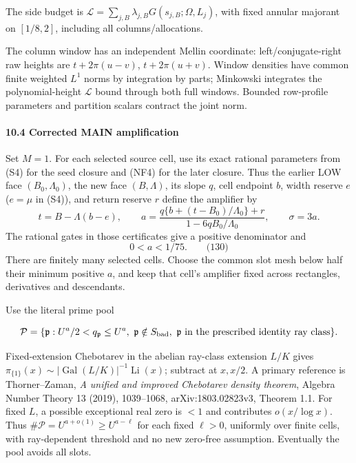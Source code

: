 The side budget is \(\mathcal L=\sum_{j,B}\lambda_{j,B}G(s_{j,B};\Omega,L_j)\), with fixed annular majorant on \([1/8,2]\), including all columns/allocations.

The column window has an independent Mellin coordinate: left/conjugate-right raw heights are \(t+2\pi(u-v)\), \(t+2\pi(u+v)\). Window densities have common finite weighted \(L^1\) norms by integration by parts; Minkowski integrates the polynomial-height \(\mathcal L\) bound through both full windows. Bounded row-profile parameters and partition scalars contract the joint norm.

\hypertarget{sr:amplifier}{}

\label{sr:amplifier}

\hypertarget{amplification-with-its-exact-local-errors}{%
\paragraph{10.4 Corrected MAIN amplification}\label{amplification-with-its-exact-local-errors}}

Set \(M=1\). For each selected source cell, use its exact rational
parameters from (S4) for the seed closure and (NF4) for the later closure.
Thus the earlier LOW face \((B_0,\Lambda_0)\), the new face \((B,\Lambda)\),
its slope \(q\), cell endpoint \(b\), width reserve \(e\) (\(e=\mu\) in (S4)), and return reserve \(r\) define the amplifier by
\[
 t=B-\Lambda(b-e),\qquad
 a=\frac{q\{b+(t-B_0)/\Lambda_0\}+r}
         {1-6qB_0/\Lambda_0},\qquad \sigma=3a.
\]
The rational gates in those certificates give a positive denominator and
\hypertarget{sr:amp-range}{}\label{sr:amp-range}
\[
 0<a<1/75.\qquad\text{(130)}
\]
There are finitely many selected cells. Choose the common slot mesh below
half their minimum positive \(a\), and keep that cell's amplifier fixed
across rectangles, derivatives and descendants.

Use the literal prime pool

\[
\mathcal P=\{\mathfrak p:U^a/2<q_{\mathfrak p}\le U^a,\
 \mathfrak p\notin S_{\rm bad},\
 \mathfrak p\text{ in the prescribed identity ray class}\}.
\]

\begin{sloppypar}
Fixed-extension Chebotarev in the abelian ray-class extension \(L/K\) gives \(\pi_{\{1\}}(x)\sim|\operatorname{Gal}(L/K)|^{-1}\operatorname{Li}(x)\); subtract at \(x,x/2\). A primary reference is Thorner--Zaman, \emph{A unified and improved Chebotarev density theorem}, Algebra Number Theory 13 (2019), 1039--1068, arXiv:1803.02823v3, Theorem 1.1. For fixed \(L\), a possible exceptional real zero is \(<1\) and contributes \(o(x/\log x)\). Thus \(\#\mathcal P=U^{a+o(1)}\ge U^{a-\ell}\) for each fixed \(\ell>0\), uniformly over finite cells, with ray-dependent threshold and no new zero-free assumption. Eventually the pool avoids all slots. 
\end{sloppypar}

